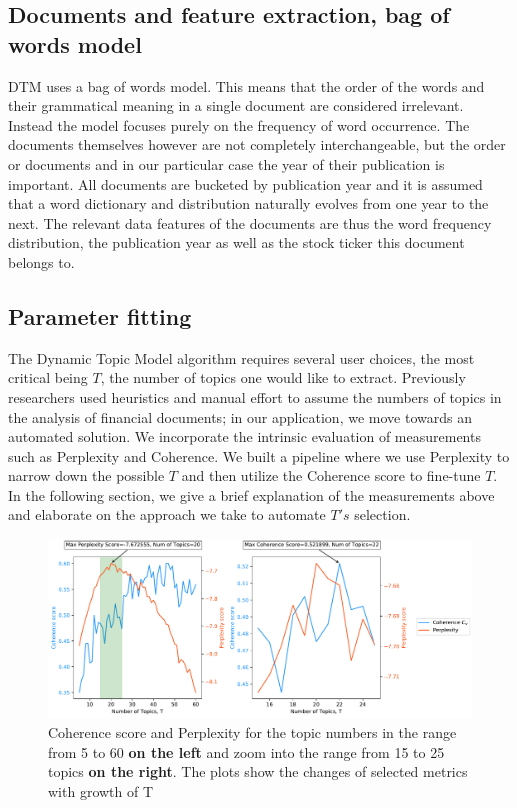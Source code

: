 \documentclass[12pt,journal,letterpaper,oneside,onecolumn]{IEEEtran}
\begin{document}
\subsection{Documents and feature extraction, bag of words model}
DTM uses a bag of words model. This means that the order of the words and their grammatical meaning in a single document are considered irrelevant. Instead the model focuses purely on the frequency of word occurrence. 
The documents themselves however are not completely interchangeable, but the order or documents and in our particular case the year of their publication is important.
All documents are bucketed by publication year and it is assumed that a word dictionary and distribution naturally evolves from one year to the next.
The relevant data features of the documents are thus the word frequency distribution, the publication year as well as the stock ticker this document belongs to.

\subsection{Parameter fitting}
The Dynamic Topic Model algorithm requires several user choices, the most critical being $T$, the number of topics one would like to extract. Previously researchers \cite{ref_Neuhierl_2013}\cite{ref_ratku_2016}  used heuristics and manual effort to assume the numbers of topics in the analysis of financial documents; in our application, we move towards an automated solution. We incorporate the intrinsic evaluation of measurements such as Perplexity and Coherence. We built a pipeline where we use Perplexity to narrow down the possible $T$ and then utilize the Coherence score to fine-tune $T$. In the following section, we give a brief explanation of the measurements above and elaborate on the approach we take to automate $T's$ selection.

\begin{figure}
    \centering
	\includegraphics[width=0.9\linewidth]{images/search_T_plot.pdf}
	\caption{Coherence score and Perplexity for the topic numbers in the range from 5 to 60 \textbf{on the left} and zoom into the range from 15 to 25 topics \textbf{on the right}. The plots show the changes of selected metrics with growth of T }
	\label{fig:topic-num}       
\end{figure}
\end{document}

